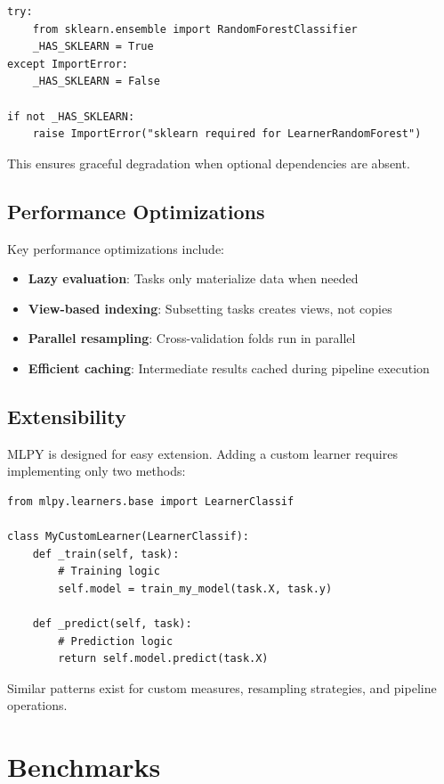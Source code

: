 \documentclass[twoside,11pt]{article}
\begin{document}
\begin{lstlisting}
try:
    from sklearn.ensemble import RandomForestClassifier
    _HAS_SKLEARN = True
except ImportError:
    _HAS_SKLEARN = False

if not _HAS_SKLEARN:
    raise ImportError("sklearn required for LearnerRandomForest")
\end{lstlisting}

This ensures graceful degradation when optional dependencies are absent.

\subsection{Performance Optimizations}

Key performance optimizations include:
\begin{itemize}
  \item \textbf{Lazy evaluation}: Tasks only materialize data when needed
  \item \textbf{View-based indexing}: Subsetting tasks creates views, not copies
  \item \textbf{Parallel resampling}: Cross-validation folds run in parallel
  \item \textbf{Efficient caching}: Intermediate results cached during pipeline execution
\end{itemize}

\subsection{Extensibility}

MLPY is designed for easy extension. Adding a custom learner requires
implementing only two methods:

\begin{lstlisting}
from mlpy.learners.base import LearnerClassif

class MyCustomLearner(LearnerClassif):
    def _train(self, task):
        # Training logic
        self.model = train_my_model(task.X, task.y)

    def _predict(self, task):
        # Prediction logic
        return self.model.predict(task.X)
\end{lstlisting}

Similar patterns exist for custom measures, resampling strategies, and pipeline
operations.

\section{Benchmarks}
\label{sec:benchmarks}
\end{document}
